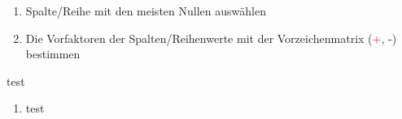 \hfill
\begin{minipage}{0.5\linewidth}
    \begin{enumerate}
        \item Spalte/Reihe mit den meisten Nullen auswählen
        \item Die Vorfaktoren der Spalten/Reihenwerte mit der Vorzeichenmatrix (\textcolor{red}{+}, \textcolor{blue}{-}) bestimmen
    \end{enumerate}
\end{minipage}

\begin{minipage}{0.45\linewidth}
    test
\end{minipage}
\hfill
\begin{minipage}{0.48\linewidth}
    \begin{enumerate}[start=3]
        \item test
    \end{enumerate}
\end{minipage}